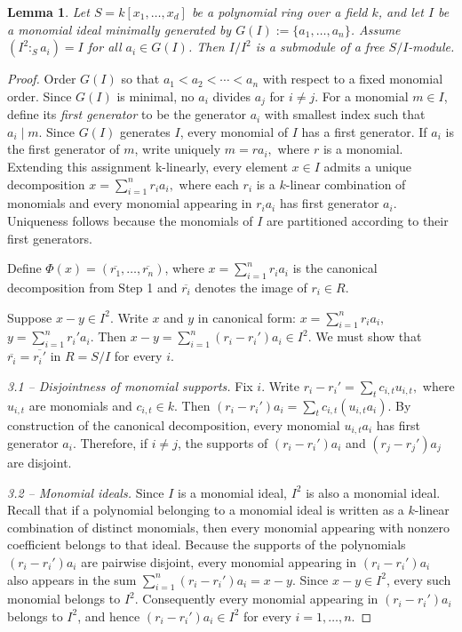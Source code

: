 \documentclass[10. pt,a4paper]{amsart}
\newtheorem{lemma}[theorem]{Lemma}
\theoremstyle{definition}
\theoremstyle{remark}
\begin{document}
\begin{lemma}
	Let $S = k[x_1,\dots,x_d]$ be a polynomial ring over a field $k$, and let $I$ be a monomial ideal minimally generated by $G(I):=\{a_1, \dots, a_n\}$. Assume $
	(I^2:_S a_i)=I$ for all $a_i\in G(I)$.
	Then $I/I^2$ is a submodule of a free $S/I$-module. 
\end{lemma}

\begin{proof}
Order \(G(I)\) so that
\(
a_1<a_2<\cdots<a_n
\)
with respect to a fixed monomial order. Since \(G(I)\) is minimal, no \(a_i\) divides \(a_j\) for \(i\neq j\).
For a monomial \(m\in I\), define its \emph{first generator} to be the generator \(a_i\) with smallest index such that \(a_i\mid m\). Since \(G(I)\) generates \(I\), every monomial of \(I\) has a first generator.
If \(a_i\) is the first generator of \(m\), write uniquely
\(
m=ra_i,
\)
where \(r\) is a monomial.
Extending this assignment k-linearly, every element \(x\in I\) admits a unique decomposition
\(
x=\sum_{i=1}^{n} r_i a_i,
\)
where each \(r_i\) is a \(k\)-linear combination of monomials and every monomial appearing in \(r_i a_i\) has first generator \(a_i\). Uniqueness follows because the monomials of \(I\) are partitioned according to their first generators.
	
	
\noindent{}
Define
\(\Phi(x)=(\overline{r_1},\dots,\overline{r_n})\),
where
$
x=\sum_{i=1}^{n} r_i a_i
$
is the canonical decomposition from Step 1 and $\overline{r_i}$ denotes the image of $ r_i\in R$.	
	
\noindent{}
Suppose \(x-y\in I^2\). Write \(x\) and \(y\) in canonical form:
\(
x=\sum_{i=1}^{n} r_i a_i,\)
\(
y=\sum_{i=1}^{n} r_i' a_i.
\)
Then
$x-y=\sum_{i=1}^{n}(r_i-r_i')a_i\in I^2.
$
We must show that
\(
\overline{r_i}=\overline{r_i'}
\)
in \(R=S/I\) for every \(i\).


\noindent\textit{3.1 -- Disjointness of monomial supports.}
Fix \(i\). Write
$
r_i-r_i'=\sum_t c_{i,t}u_{i,t},
$
where \(u_{i,t}\) are monomials and \(c_{i,t}\in k\). Then
$
(r_i-r_i')a_i=\sum_t c_{i,t}(u_{i,t}a_i).
$ By construction of the canonical decomposition, every monomial
\(u_{i,t}a_i\) has first generator \(a_i\). Therefore, if \(i\neq j\),
the supports of \((r_i-r_i')a_i\) and \((r_j-r_j')a_j\) are disjoint.


\noindent\textit{3.2 -- Monomial ideals.}
Since \(I\) is a monomial ideal, \(I^2\) is also a monomial ideal.
Recall that if a polynomial belonging to a monomial ideal is written as
a \(k\)-linear combination of distinct monomials, then every monomial
appearing with nonzero coefficient belongs to that ideal.
Because the supports of the polynomials
\((r_i-r_i')a_i\) are pairwise disjoint, every monomial appearing in
\((r_i-r_i')a_i\) also appears in the sum
$
\sum_{i=1}^{n}(r_i-r_i')a_i=x-y.
$ Since \(x-y\in I^2\), every such monomial belongs to \(I^2\).
Consequently every monomial appearing in \((r_i-r_i')a_i\) belongs to
\(I^2\), and hence
$
(r_i-r_i')a_i\in I^2
$ for every \(i=1,\dots,n\).



\end{proof}
\end{document}
